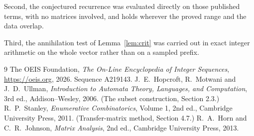 \documentclass[11pt,a4paper]{article}
\theoremstyle{plain}
\theoremstyle{definition}
\begin{document}
Second, the conjectured recurrence was evaluated directly on those published terms, with no
matrices involved, and holds wherever the proved range and the data overlap.

Third, the annihilation test of Lemma~\ref{lem:crit} was carried out in exact integer
arithmetic on the whole vector rather than on a sampled prefix.

\begin{thebibliography}{9}
 The OEIS Foundation, \emph{The On-Line Encyclopedia of Integer
Sequences}, \url{https://oeis.org}, 2026. Sequence A219143.
 J.~E.~Hopcroft, R.~Motwani and J.~D.~Ullman, \emph{Introduction to Automata
Theory, Languages, and Computation}, 3rd ed., Addison--Wesley, 2006. (The subset
construction, Section 2.3.)
 R.~P.~Stanley, \emph{Enumerative Combinatorics}, Volume 1, 2nd ed.,
Cambridge University Press, 2011. (Transfer-matrix method, Section 4.7.)
 R.~A.~Horn and C.~R.~Johnson, \emph{Matrix Analysis}, 2nd ed., Cambridge
University Press, 2013.
\end{thebibliography}
\end{document}
